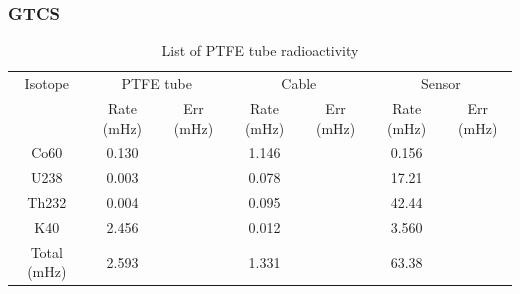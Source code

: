 \documentclass[review,number,sort&compress]{elsarticle}
\begin{document}
%

\subsubsection{GTCS}

\begin{table}[h]
	\centering
	\caption{List of PTFE tube radioactivity}
	\small
	\renewcommand\tabcolsep{1mm} 
	\begin{tabular*}{125mm}{c|cc|cc|cc}
		\hline
		Isotope	&\multicolumn{2}{c|}{PTFE tube}	&\multicolumn{2}{c|}{Cable}	 &\multicolumn{2}{c}{Sensor} \\
				& 	Rate (mHz)	&	Err (mHz)	& 	Rate (mHz)	&	Err (mHz)& 	Rate (mHz)	&	Err (mHz)\\
		\hline
		Co60	& 	0.130	&		 	& 	1.146	&		 &	0.156		&		 \\ 
		U238 	&   0.003	&		 	&   0.078	&		 &  17.21		&		 \\
		Th232	&	0.004	&		 	&	0.095	&		 &	42.44		&		 \\
		K40		& 	2.456	&		 	& 	0.012	&		 & 	3.560		&		 \\
	Total (mHz)	&	2.593	&		 	&	1.331	&		 &	63.38		&		 \\
		\hline
	\end{tabular*}
\end{table}
\end{document}
